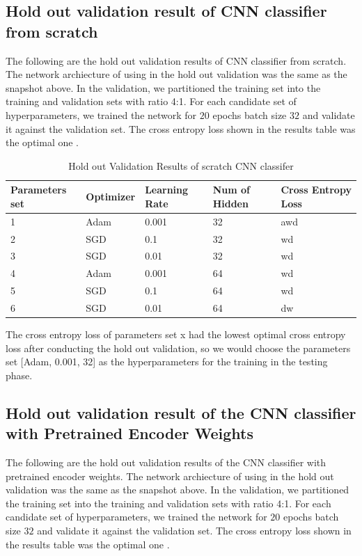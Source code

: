 \documentclass{article}
\begin{document}
\subsection{Hold out validation result of CNN classifier from scratch}

The following are the hold out validation results of CNN classifier from scratch. The network archiecture of using in the hold out validation was the same as the snapshot above. In the validation, we partitioned the training set into the training and validation sets with ratio 4:1. For each candidate set of hyperparameters, we trained the network for $20$ epochs batch size $32$ and validate it against the validation set. The cross entropy loss shown in the results table was the optimal one .

\pagebreak

\begin{table}[htb]
\caption{Hold out Validation Results of scratch CNN classifer}
	\label{sample-table}
	\centering
\begin{tabular}{lllll}
\toprule
		\cmidrule{1-5}
		Parameters set& Optimizer & Learning Rate & Num of Hidden & Cross Entropy Loss 		\\
		\midrule
 			1 & Adam & 0.001 & 32 & awd \\
 			2 & SGD & 0.1 & 32 &  wd\\
 			3 & SGD & 0.01 & 32 & wd \\
			4 & Adam & 0.001 & 64 & wd \\
 			5 & SGD & 0.1 & 64 &  wd\\
 			6 & SGD & 0.01 & 64 & dw \\
\bottomrule
\end{tabular}
\end{table}

The cross entropy loss of parameters set x had the lowest optimal cross entropy loss after conducting the hold out validation, so we would choose the parameters set [Adam, 0.001, 32] as the hyperparameters for the training in the testing phase.


\subsection{Hold out validation result of the CNN classifier with Pretrained Encoder Weights}

The following are the hold out validation results of the CNN classifier with pretrained encoder weights. The network archiecture of using in the hold out validation was the same as the snapshot above. In the validation, we partitioned the training set into the training and validation sets with ratio 4:1. For each candidate set of hyperparameters, we trained the network for $20$ epochs batch size $32$ and validate it against the validation set. The cross entropy loss shown in the results table was the optimal one .
\end{document}
